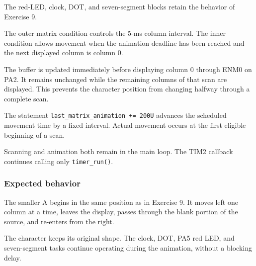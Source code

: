 \documentclass[a4paper]{article}
\begin{document}
The red-LED, clock, DOT, and seven-segment
blocks retain the behavior of Exercise 9.

The outer matrix condition controls the
5-ms column interval. The inner condition
allows movement when the animation deadline
has been reached and the next displayed
column is column 0.

The buffer is updated immediately before
displaying column 0 through ENM0 on PA2.
It remains unchanged while the remaining
columns of that scan are displayed.
This prevents the character position from
changing halfway through a complete scan.

The statement
\texttt{last\_matrix\_animation += 200U}
advances the scheduled movement time
by a fixed interval. Actual movement occurs
at the first eligible beginning of a scan.

Scanning and animation both remain in
the main loop. The TIM2 callback continues
calling only \texttt{timer\_run()}.

\subsubsection{Expected behavior}

The smaller A begins in the same position
as in Exercise 9. It moves left one column
at a time, leaves the display, passes through
the blank portion of the source, and re-enters
from the right.

The character keeps its original shape.
The clock, DOT, PA5 red LED, and seven-segment
tasks continue operating during the animation,
without a blocking delay.
\end{document}
